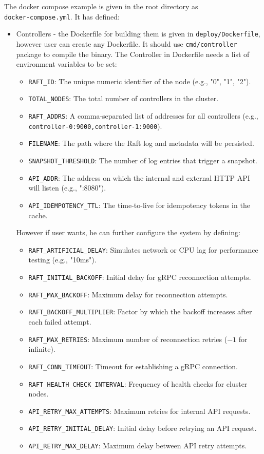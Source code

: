 \documentclass[shortabstract]{iithesis}
\begin{document}
The docker compose example is given in the root directory as \\ \texttt{docker-compose.yml}. It has defined:
\begin{itemize}
    \item Controllers - the Dockerfile for building them is given in \texttt{deploy/Dockerfile}, however user can create any Dockerfile. It should use \texttt{cmd/controller} package to compile the binary. The Controller in Dockerfile needs a list of environment variables to be set:
    \begin{itemize}
        \item \texttt{RAFT\_ID}: The unique numeric identifier of the node (e.g., "0", "1", "2").
        \item \texttt{TOTAL\_NODES}: The total number of controllers in the cluster.
        \item \texttt{RAFT\_ADDRS}: A comma-separated list of addresses for all controllers (e.g., \texttt{controller-0:9000,controller-1:9000}).
        \item \texttt{FILENAME}: The path where the Raft log and metadata will be persisted.
        \item \texttt{SNAPSHOT\_THRESHOLD}: The number of log entries that trigger a snapshot.
        \item \texttt{API\_ADDR}: The address on which the internal and external HTTP API will listen (e.g., ":8080").
        \item \texttt{API\_IDEMPOTENCY\_TTL}: The time-to-live for idempotency tokens in the cache.
    \end{itemize}
    However if user wants, he can further configure the system by defining:
    \begin{itemize}
        \item \texttt{RAFT\_ARTIFICIAL\_DELAY}: Simulates network or CPU lag for performance testing (e.g., "10ms").
        \item \texttt{RAFT\_INITIAL\_BACKOFF}: Initial delay for gRPC reconnection attempts.
        \item \texttt{RAFT\_MAX\_BACKOFF}: Maximum delay for reconnection attempts.
        \item \texttt{RAFT\_BACKOFF\_MULTIPLIER}: Factor by which the backoff increases after each failed attempt.
        \item \texttt{RAFT\_MAX\_RETRIES}: Maximum number of reconnection retries ($-1$ for infinite).
        \item \texttt{RAFT\_CONN\_TIMEOUT}: Timeout for establishing a gRPC connection.
        \item \texttt{RAFT\_HEALTH\_CHECK\_INTERVAL}: Frequency of health checks for cluster nodes.
        \item \texttt{API\_RETRY\_MAX\_ATTEMPTS}: Maximum retries for internal API requests.
        \item \texttt{API\_RETRY\_INITIAL\_DELAY}: Initial delay before retrying an API request.
        \item \texttt{API\_RETRY\_MAX\_DELAY}: Maximum delay between API retry attempts.
    \end{itemize}


\end{itemize}
\end{document}
